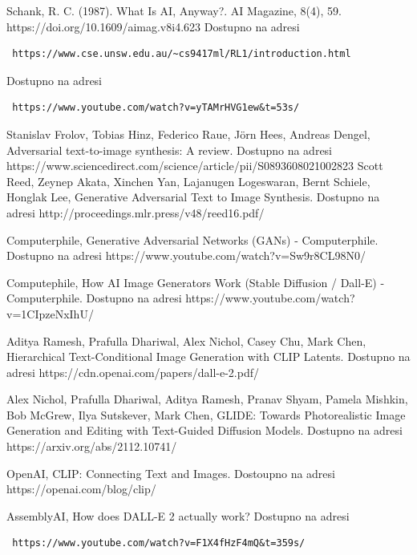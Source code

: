 \documentclass[12pt, letterpaper]{article}
\begin{document}
\pagebreak
\begin{thebibliography}{10}

 Schank, R. C. (1987). What Is AI, Anyway?. AI Magazine, 8(4), 59. https://doi.org/10.1609/aimag.v8i4.623  
 Dostupno na adresi\begin{verbatim} https://www.cse.unsw.edu.au/~cs9417ml/RL1/introduction.html \end{verbatim}  
 Dostupno na adresi\begin{verbatim} https://www.youtube.com/watch?v=yTAMrHVG1ew&t=53s/ \end{verbatim} 

 Stanislav Frolov, Tobias Hinz, Federico Raue, Jörn Hees, Andreas Dengel, Adversarial text-to-image synthesis: A review. Dostupno na adresi https://www.sciencedirect.com/science/article/pii/S0893608021002823
 Scott Reed, Zeynep Akata, Xinchen Yan, Lajanugen Logeswaran, Bernt Schiele, Honglak Lee, Generative Adversarial Text to Image Synthesis. Dostupno na adresi http://proceedings.mlr.press/v48/reed16.pdf/

 Computerphile, Generative Adversarial Networks (GANs) - Computerphile. Dostupno na adresi https://www.youtube.com/watch?v=Sw9r8CL98N0/

 Computephile, How AI Image Generators Work (Stable Diffusion / Dall-E) - Computerphile. Dostupno na adresi https://www.youtube.com/watch?v=1CIpzeNxIhU/

 Aditya Ramesh, Prafulla Dhariwal, Alex Nichol, Casey Chu, Mark Chen, Hierarchical Text-Conditional
Image Generation with CLIP Latents. Dostupno na adresi https://cdn.openai.com/papers/dall-e-2.pdf/

 Alex Nichol, Prafulla Dhariwal, Aditya Ramesh, Pranav Shyam, Pamela Mishkin, Bob McGrew, Ilya Sutskever, Mark Chen, GLIDE: Towards Photorealistic Image Generation and Editing with Text-Guided Diffusion Models. Dostupno na adresi https://arxiv.org/abs/2112.10741/

 OpenAI, CLIP: Connecting
Text and Images. Dostoupno na adresi https://openai.com/blog/clip/

 AssemblyAI, How does DALL-E 2 actually work? Dostupno na adresi\begin{verbatim} https://www.youtube.com/watch?v=F1X4fHzF4mQ&t=359s/

\end{verbatim}


\end{thebibliography}
\end{document}
